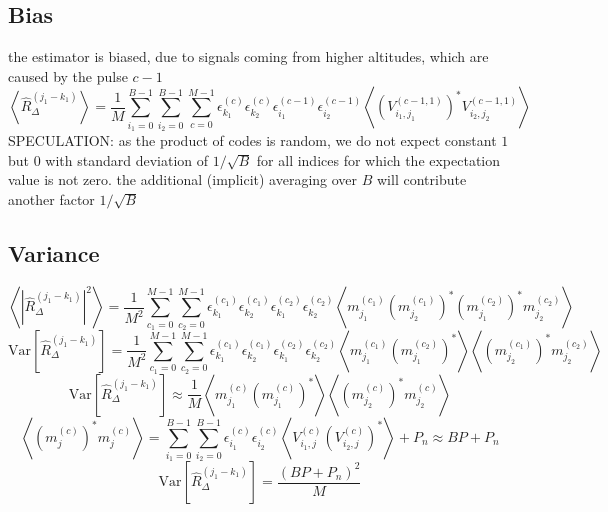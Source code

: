 \documentclass[18pt,a4paper]{extarticle}
\begin{document}
\subsection{Bias}
the estimator is biased, due to signals coming from higher altitudes, which are caused by the pulse $c-1$
\begin{equation}
\left\langle \hat{R}^{(j_1 - k_1)}_\Delta \right\rangle =
\frac{1}{M} \sum_{i_1=0}^{B-1} \sum_{i_2=0}^{B-1} \sum_{c=0}^{M-1} \epsilon^{(c)}_{k_1} \epsilon^{(c)}_{k_2} \epsilon^{(c-1)}_{i_1}\epsilon^{(c-1)}_{i_2} \left\langle \left( V^{(c-1, 1)}_{i_1,j_1}\right)^* V^{(c-1, 1)}_{i_2,j_2} \right\rangle
\end{equation}
SPECULATION: as the product of codes is random, we do not expect constant $1$ but $0$ with standard deviation of $1/\sqrt{B}$ for all indices for which the expectation value is not zero.
the additional (implicit) averaging over $B$ will contribute another factor $1/\sqrt{B}$

\subsection{Variance}
\begin{equation}
\left\langle \left| \hat{R}^{(j_1 - k_1)}_\Delta \right|^2 \right\rangle =
\frac{1}{M^2} \sum_{c_1=0}^{M-1} \sum_{c_2=0}^{M-1}
\epsilon^{(c_1)}_{k_1} \epsilon^{(c_1)}_{k_2}
\epsilon^{(c_2)}_{k_1} \epsilon^{(c_2)}_{k_2}
\left\langle
m^{(c_1)}_{j_1} \left( m^{(c_1)}_{j_2}\right)^*
\left(m^{(c_2)}_{j_1}\right)^* m^{(c_2)}_{j_2}
\right\rangle
\end{equation}
\begin{equation}
\mathrm{Var}\left[\hat{R}^{(j_1 - k_1)}_\Delta \right] =
\frac{1}{M^2} \sum_{c_1=0}^{M-1} \sum_{c_2=0}^{M-1}
\epsilon^{(c_1)}_{k_1} \epsilon^{(c_1)}_{k_2}
\epsilon^{(c_2)}_{k_1} \epsilon^{(c_2)}_{k_2}
\left\langle m^{(c_1)}_{j_1} \left(m^{(c_2)}_{j_1}\right)^* \right\rangle
\left\langle \left(m^{(c_1)}_{j_2}\right)^* m^{(c_2)}_{j_2} \right\rangle
\end{equation}
\begin{equation}
\mathrm{Var}\left[\hat{R}^{(j_1 - k_1)}_\Delta \right] \approx \frac{1}{M}
\left\langle m^{(c)}_{j_1} \left(m^{(c)}_{j_1}\right)^* \right\rangle
\left\langle \left(m^{(c)}_{j_2}\right)^* m^{(c)}_{j_2} \right\rangle
\end{equation}
\begin{equation}
\left\langle \left(m^{(c)}_j\right)^* m^{(c)}_j \right\rangle = \sum_{i_1=0}^{B-1} \sum_{i_2=0}^{B-1} \epsilon^{(c)}_{i_1} \epsilon^{(c)}_{i_2} \left\langle V^{(c)}_{i_1,j}\left(V^{(c)}_{i_2,j}\right)^*\right\rangle + P_n \approx BP + P_n
\end{equation}
\begin{equation}
\mathrm{Var}\left[\hat{R}^{(j_1 - k_1)}_\Delta \right] = \frac{(BP + P_n)^2}{M}
\end{equation}
\end{document}
